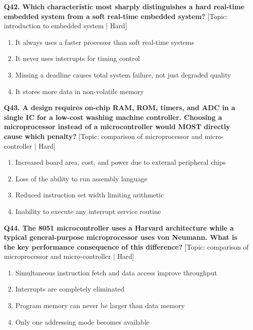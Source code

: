 \noindent\textbf{Q42. Which characteristic most sharply distinguishes a hard real-time embedded system from a soft real-time embedded system?} \hfill [Topic: introduction to embedded system | Hard]
\begin{enumerate}[label=(\alph*),topsep=2pt,itemsep=1pt,partopsep=0pt,parsep=0pt]
    \item {It always uses a faster processor than soft real-time systems}
    \item {It never uses interrupts for timing control}
    \item {Missing a deadline causes total system failure, not just degraded quality}
    \item {It stores more data in non-volatile memory}
\end{enumerate}
\vspace{2mm}

\noindent\textbf{Q43. A design requires on-chip RAM, ROM, timers, and ADC in a single IC for a low-cost washing machine controller. Choosing a microprocessor instead of a microcontroller would MOST directly cause which penalty?} \hfill [Topic: comparison of microprocessor and micro-controller | Hard]
\begin{enumerate}[label=(\alph*),topsep=2pt,itemsep=1pt,partopsep=0pt,parsep=0pt]
    \item {Increased board area, cost, and power due to external peripheral chips}
    \item {Loss of the ability to run assembly language}
    \item {Reduced instruction set width limiting arithmetic}
    \item {Inability to execute any interrupt service routine}
\end{enumerate}
\vspace{2mm}

\noindent\textbf{Q44. The 8051 microcontroller uses a Harvard architecture while a typical general-purpose microprocessor uses von Neumann. What is the key performance consequence of this difference?} \hfill [Topic: comparison of microprocessor and micro-controller | Hard]
\begin{enumerate}[label=(\alph*),topsep=2pt,itemsep=1pt,partopsep=0pt,parsep=0pt]
    \item {Simultaneous instruction fetch and data access improve throughput}
    \item {Interrupts are completely eliminated}
    \item {Program memory can never be larger than data memory}
    \item {Only one addressing mode becomes available}
\end{enumerate}
\vspace{2mm}

